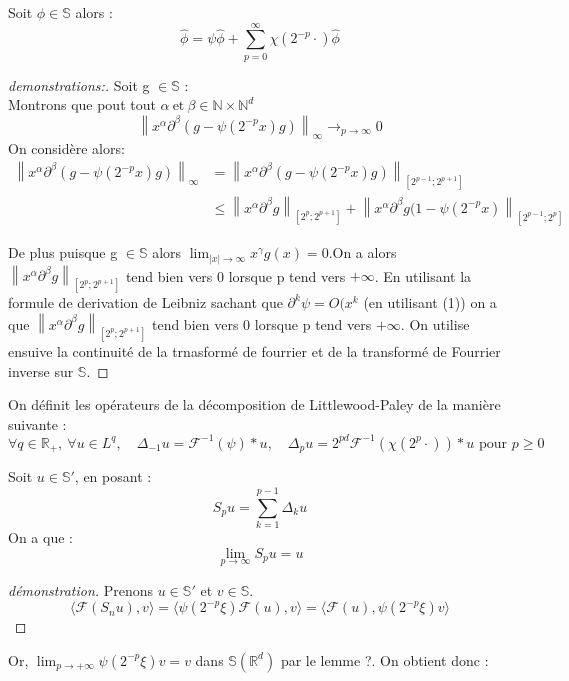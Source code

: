 \documentclass{article}
\begin{document}
\begin{lemma}[Lemme I-?]
Soit $\phi \in \mathbb{S}$ alors :
\[
\hat{\phi} = \psi \hat{\phi} + \sum_{p=0}^\infty \chi(2^{-p} \cdot) \hat{\phi}
\]
\end{lemma}
\begin{proof}[demonstrations:]
Soit g $\in \mathbb{S}$ : \\
Montrons que pout tout $\alpha \ \text{et} \ \beta \in \mathbb{N}\times \mathbb{N}^d $
$$\left\lVert x^\alpha \partial^\beta(g-\psi(2^{-p}x)g) \right\rVert_\infty \to_{p\to \infty} 0$$
On considère alors:
\begin{align*}
    \left\lVert x^\alpha \partial^\beta(g-\psi(2^{-p}x)g)\right\rVert_\infty &= \left\lVert x^\alpha \partial^\beta(g-\psi(2^{-p}x)g)\right\rVert_{[2^{p-1};2^{p+1}]} \\
    &\leq \left\lVert x^\alpha \partial^\beta g\right\rVert_{[2^{p};2^{p+1}]} + \left\lVert x^\alpha \partial^\beta g(1-\psi(2^{-p}x)\right\rVert_{[2^{p-1};2^{p}]}
\end{align*}

De plus puisque g $\in \mathbb{S}$ alors $\lim_{|x| \to \infty} x^\gamma g(x)=0$.On a alors $\left\lVert x^\alpha \partial^\beta g\right\rVert_{[2^{p};2^{p+1}]}$ tend bien vers 0 lorsque p tend vers $+\infty$. En utilisant la formule de derivation de Leibniz sachant que $\partial^k \psi = O(x^{k}$ (en utilisant (1)) on a que $\left\lVert x^\alpha \partial^\beta g\right\rVert_{[2^{p};2^{p+1}]}$ tend bien vers 0 lorsque p tend vers $+\infty$. On utilise ensuive la continuité de la trnasformé de fourrier et de la transformé de Fourrier inverse sur $\mathbb{S}$.


\end{proof}

\begin{defin}[Définition]
On définit les opérateurs de la décomposition de Littlewood-Paley de la manière suivante :
\[
\forall q \in \mathbb{R_+}, \ \forall u \in L^q, \quad \Delta_{-1} u = \mathcal{F}^{-1}(\psi) \ast u, \quad \Delta_{p} u = 2^{pd} \mathcal{F}^{-1}(\chi(2^p \cdot)) \ast u \text{ pour } p \geq 0
\]
\end{defin}

\begin{prop}[Propriété]
Soit $u \in \mathbb{S}'$, en posant :
\[
S_p u = \sum_{k=1}^{p-1} \Delta_k u
\]
On a que :
\[
\lim_{p \to \infty} S_p u = u
\]
\end{prop}

\begin{proof}[démonstration]
Prenons $u \in \mathbb{S}'$ et $v \in \mathbb{S}$.\\

\[
\langle \mathcal{F}(S_n u), v \rangle = \langle \psi(2^{-p}\xi) \mathcal{F}(u), v \rangle = \langle \mathcal{F}(u), \psi(2^{-p}\xi) v \rangle
\]
\end{proof}
Or, $\lim_{p \to +\infty} \psi(2^{-p}\xi)v = v$ dans $\mathbb{S}(\mathbb{R}^d)$ par le lemme ?. On obtient donc :
\end{document}
